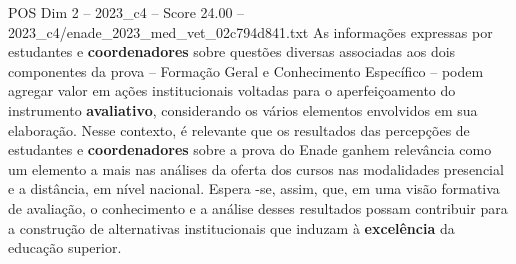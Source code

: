 \begin{textsample}{POS Dim 2 – 2023\_c4 – Score 24.00 – 2023\_c4/enade\_2023\_med\_vet\_02c794d841.txt}
As informações expressas por estudantes e \textbf{coordenadores} sobre questões diversas associadas aos dois componentes da prova – Formação Geral e Conhecimento Específico – podem agregar valor em ações institucionais voltadas para o aperfeiçoamento do instrumento \textbf{avaliativo}, considerando os vários elementos envolvidos em sua elaboração.
Nesse contexto, é relevante que os resultados das percepções de estudantes e \textbf{coordenadores} sobre a prova do Enade ganhem relevância como um elemento a mais nas análises da oferta dos cursos nas modalidades presencial e a distância, em nível nacional.
Espera -se, assim, que, em uma visão formativa de avaliação, o conhecimento e a análise desses resultados possam contribuir para a construção de alternativas institucionais que induzam à \textbf{excelência} da educação superior.

\end{textsample}
